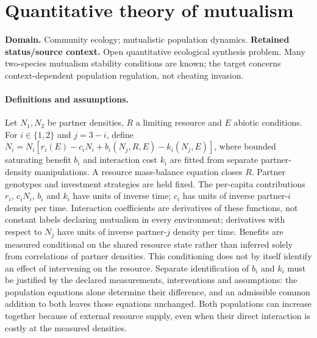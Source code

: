 \documentclass[11pt]{article}
\begin{document}
\section*{Quantitative theory of mutualism}
\label{prob:186}
\label{rank:167}
\par\smallskip

\noindent\textbf{Domain.} Community ecology; mutualistic population dynamics. \quad \textbf{Retained status/source context.} Open quantitative ecological synthesis problem. Many two-species mutualism stability conditions are known; the target concerns context-dependent population regulation, not cheating invasion.
\paragraph{Definitions and assumptions.} Let $N_1,N_2$ be partner densities, $R$ a limiting resource and $E$ abiotic conditions. For $i\in\{1,2\}$ and $j=3-i$, define $\dot N_i=N_i[r_i(E)-c_iN_i+b_i(N_j,R,E)-k_i(N_j,E)]$, where bounded saturating benefit $b_i$ and interaction cost $k_i$ are fitted from separate partner-density manipulations. A resource mass-balance equation closes $R$. Partner genotypes and investment strategies are held fixed. The per-capita contributions $r_i$, $c_iN_i$, $b_i$ and $k_i$ have units of inverse time; $c_i$ has units of inverse partner-$i$ density per time. Interaction coefficients are derivatives of these functions, not constant labels declaring mutualism in every environment; derivatives with respect to $N_j$ have units of inverse partner-$j$ density per time. Benefits are measured conditional on the shared resource state rather than inferred solely from correlations of partner densities. This conditioning does not by itself identify an effect of intervening on the resource. Separate identification of $b_i$ and $k_i$ must be justified by the declared measurements, interventions and assumptions: the population equations alone determine their difference, and an admissible common addition to both leaves those equations unchanged. Both populations can increase together because of external resource supply, even when their direct interaction is costly at the measured densities.
\end{document}
